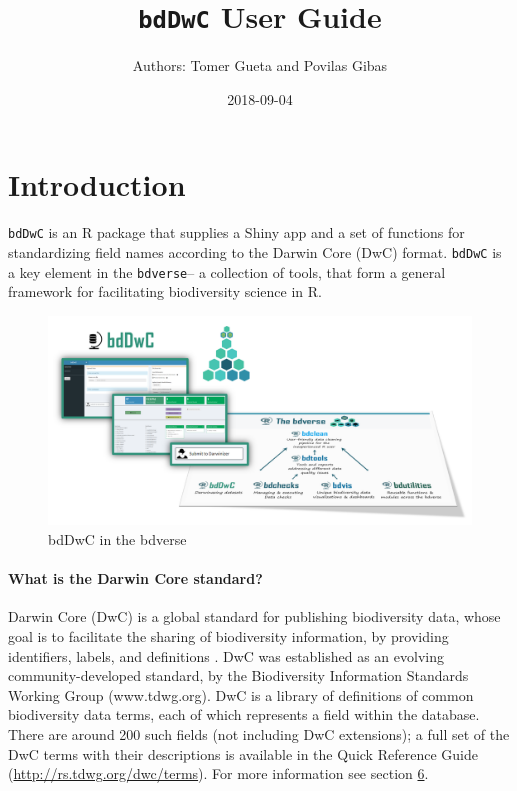 \documentclass[]{book}
\title{\texttt{bdDwC} User Guide}
\author{Authors: Tomer Gueta and Povilas Gibas}
\date{2018-09-04}
\theoremstyle{definition}
\theoremstyle{definition}
\theoremstyle{definition}
\theoremstyle{remark}
\begin{document}
\maketitle

{
\setcounter{tocdepth}{1}
\tableofcontents
}
\chapter*{Introduction}\label{introduction}

\texttt{bdDwC} is an R package that supplies a Shiny app and a set of
functions for standardizing field names according to the Darwin Core
(DwC) format. \texttt{bdDwC} is a key element in the \texttt{bdverse}--
a collection of tools, that form a general framework for facilitating
biodiversity science in R.

\begin{figure}
\centering
\includegraphics{img/bdDwC_bdverse.png}
\caption{bdDwC in the bdverse}
\end{figure}

\subsubsection*{What is the Darwin Core
standard?}\label{what-is-the-darwin-core-standard}

Darwin Core (DwC) is a global standard for publishing biodiversity data,
whose goal is to facilitate the sharing of biodiversity information, by
providing identifiers, labels, and definitions \citep{DwC-paper}. DwC
was established as an evolving community-developed standard, by the
Biodiversity Information Standards Working Group (www.tdwg.org). DwC is
a library of definitions of common biodiversity data terms, each of
which represents a field within the database. There are around 200 such
fields (not including DwC extensions); a full set of the DwC terms with
their descriptions is available in the Quick Reference Guide
(\url{http://rs.tdwg.org/dwc/terms}). For more information see section
\protect\hyperlink{learn-more-about-darwin-core}{6}.
\end{document}
